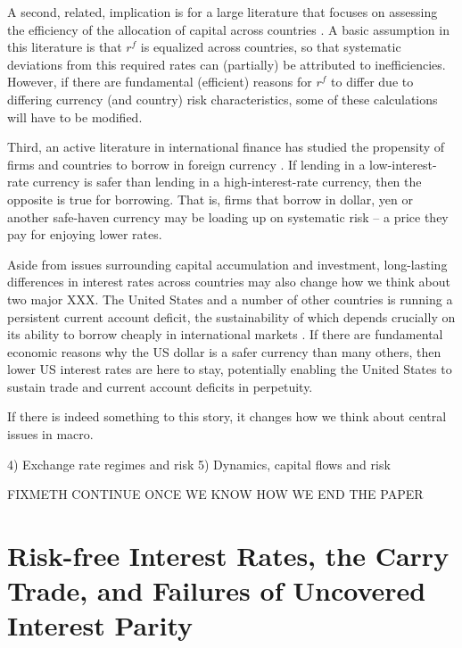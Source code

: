 \documentclass{ar-1col}
\begin{document}
A second, related, implication is for a large literature that focuses
on assessing the efficiency of the allocation of capital across
countries \citep{HallJones1997, CaselliFeyrer2007}. A basic assumption
in this literature is that $r^f$ is equalized across countries, so
that systematic deviations from this required rates can (partially) be
attributed to inefficiencies. However, if there are fundamental
(efficient) reasons for $r^f$ to differ due to differing currency (and
country) risk characteristics, some of these calculations will have to
be modified.

Third, an active literature in international finance has studied the
propensity of firms and countries to borrow in foreign currency
\citep{DuSchreger2016, KalemliOzcanetal2019}. If lending in a
low-interest-rate currency is safer than lending in a
high-interest-rate currency, then the opposite is true for borrowing.
That is, firms that borrow in dollar, yen or another safe-haven
currency may be loading up on systematic risk -- a price they pay for
enjoying lower rates.

Aside from issues surrounding capital accumulation and investment,
long-lasting differences in interest rates across countries may also
change how we think about two major XXX. The United States and a
number of other countries is running a persistent current account
deficit, the sustainability of which depends crucially on its ability
to borrow cheaply in international markets \citep{GourinchasRey2007}.
If there are fundamental economic reasons why the US dollar is a safer
currency than many others, then lower US interest rates are here to
stay, potentially enabling the United States to sustain trade and
current account deficits in perpetuity.

If there is indeed something to this story, it changes how we think
about central issues in macro.

4) Exchange rate regimes and risk 5) Dynamics, capital flows and risk

FIXMETH CONTINUE ONCE WE KNOW HOW WE END THE PAPER

\section{Risk-free Interest Rates, the Carry Trade, and Failures of
  Uncovered Interest Parity}
\end{document}
